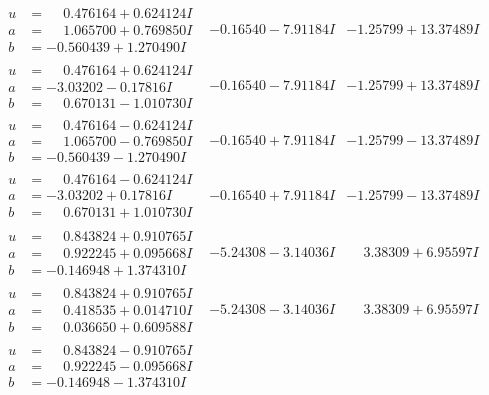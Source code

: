 \documentclass[1p]{elsarticle_modified}
\theoremstyle{definition}
\begin{document}
$$\begin{array}{c|c|c}
\begin{aligned}
u &= \phantom{-}0.476164 + 0.624124 I \\
a &= \phantom{-}1.065700 + 0.769850 I \\
b &= -0.560439 + 1.270490 I\end{aligned}
 & -0.16540 - 7.91184 I & -1.25799 + 13.37489 I \\ \hline\begin{aligned}
u &= \phantom{-}0.476164 + 0.624124 I \\
a &= -3.03202 - 0.17816 I \\
b &= \phantom{-}0.670131 - 1.010730 I\end{aligned}
 & -0.16540 - 7.91184 I & -1.25799 + 13.37489 I \\ \hline\begin{aligned}
u &= \phantom{-}0.476164 - 0.624124 I \\
a &= \phantom{-}1.065700 - 0.769850 I \\
b &= -0.560439 - 1.270490 I\end{aligned}
 & -0.16540 + 7.91184 I & -1.25799 - 13.37489 I \\ \hline\begin{aligned}
u &= \phantom{-}0.476164 - 0.624124 I \\
a &= -3.03202 + 0.17816 I \\
b &= \phantom{-}0.670131 + 1.010730 I\end{aligned}
 & -0.16540 + 7.91184 I & -1.25799 - 13.37489 I \\ \hline\begin{aligned}
u &= \phantom{-}0.843824 + 0.910765 I \\
a &= \phantom{-}0.922245 + 0.095668 I \\
b &= -0.146948 + 1.374310 I\end{aligned}
 & -5.24308 - 3.14036 I & \phantom{-}3.38309 + 6.95597 I \\ \hline\begin{aligned}
u &= \phantom{-}0.843824 + 0.910765 I \\
a &= \phantom{-}0.418535 + 0.014710 I \\
b &= \phantom{-}0.036650 + 0.609588 I\end{aligned}
 & -5.24308 - 3.14036 I & \phantom{-}3.38309 + 6.95597 I \\ \hline\begin{aligned}
u &= \phantom{-}0.843824 - 0.910765 I \\
a &= \phantom{-}0.922245 - 0.095668 I \\
b &= -0.146948 - 1.374310 I\end{aligned}

\end{array}$$
\end{document}
